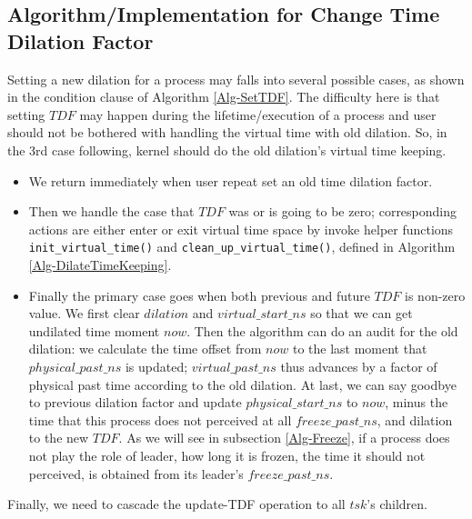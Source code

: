\documentclass{acm_proc_article-sp}
\begin{document}
\subsection{Algorithm/Implementation for Change Time Dilation Factor}
Setting a new dilation for a process may falls into several possible cases, as shown in the condition clause of Algorithm \ref{Alg-SetTDF}. 
The difficulty here is that setting $TDF$ may happen during the lifetime/execution of a process and user should not be bothered with handling the virtual time with old dilation. 
So, in the 3rd case following, kernel should do the old dilation's virtual time keeping.
\begin{itemize}
\item We return immediately when user repeat set an old time dilation factor.
\item Then we handle the case that $TDF$ was or is going to be zero; corresponding actions are either enter or exit virtual time space by invoke helper functions \texttt{init\_virtual\_time()} and \texttt{clean\_up\_virtual\_time()}, defined in Algorithm \ref{Alg-DilateTimeKeeping}.
\item Finally the primary case goes when both previous and future $TDF$ is non-zero value. We first clear $dilation$ and $virtual\_start\_ns$ so that we can get undilated time moment $now$. 
Then the algorithm can do an audit for the old dilation: we calculate the time offset from $now$ to the last moment that $physical\_past\_ns$ is updated; $virtual\_past\_ns$ thus advances by a factor of physical past time according to the old dilation. 
At last, we can say goodbye to previous dilation factor and update $physical\_start\_ns$ to $now$, minus the time that this process does not perceived at all $freeze\_past\_ns$, and dilation to the new $TDF$. 
As we will see in subsection \ref{Alg-Freeze}, if a process does not play the role of leader, how long it is frozen, the time it should not perceived, is obtained from its leader's $freeze\_past\_ns$.
\end{itemize}

Finally, we need to cascade the update-TDF operation to all $tsk$'s children. 
\end{document}
